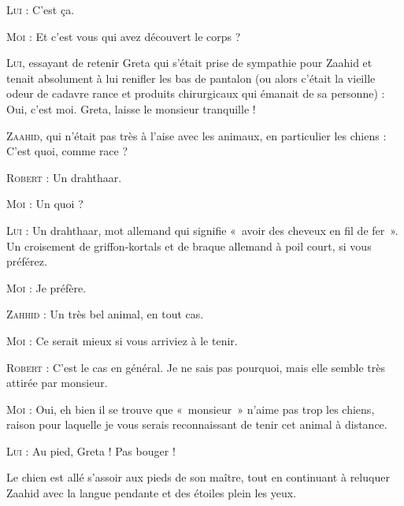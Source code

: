 \begin{dialogue}

\textsc{Lui} : C’est ça.

\textsc{Moi} : Et c’est vous qui avez découvert le corps ?

\textsc{Lui}, essayant de retenir Greta qui s’était prise de sympathie pour Zaahid et tenait absolument à lui renifler les bas de pantalon (ou alors c’était la vieille odeur de cadavre rance et produits chirurgicaux qui émanait de sa personne) : Oui, c’est moi. Greta, laisse le monsieur tranquille !

\textsc{Zaahid}, qui n’était pas très à l’aise avec les animaux, en particulier les chiens : C’est quoi, comme race ?

\textsc{Robert} : Un drahthaar.

\textsc{Moi} : Un quoi ?

\textsc{Lui} : Un drahthaar, mot allemand qui signifie «~avoir des cheveux en fil de fer~». Un croisement de griffon-kortals et de braque allemand à poil court, si vous préférez.

\textsc{Moi} : Je préfère.

\textsc{Zahhid} : Un très bel animal, en tout cas.

\textsc{Moi} : Ce serait mieux si vous arriviez à le tenir.

\textsc{Robert} : C’est le cas en général. Je ne sais pas pourquoi, mais elle semble très attirée par monsieur.

\textsc{Moi} : Oui, eh bien il se trouve que «~monsieur~» n’aime pas trop les chiens, raison pour laquelle je vous serais reconnaissant de tenir cet animal à distance.

\textsc{Lui} : Au pied, Greta ! Pas bouger !

\end{dialogue}

Le chien est allé s’assoir aux pieds de son maître, tout en continuant à reluquer Zaahid avec la langue pendante et des étoiles plein les yeux.

